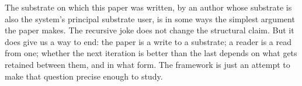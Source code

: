 \documentclass[11pt,letterpaper]{article}
\begin{document}
The substrate on which this paper was written, by an author whose substrate is also the system's principal substrate user, is in some ways the simplest argument the paper makes. The recursive joke does not change the structural claim. But it does give us a way to end: the paper is a write to a substrate; a reader is a read from one; whether the next iteration is better than the last depends on what gets retained between them, and in what form. The framework is just an attempt to make that question precise enough to study.
\end{document}
